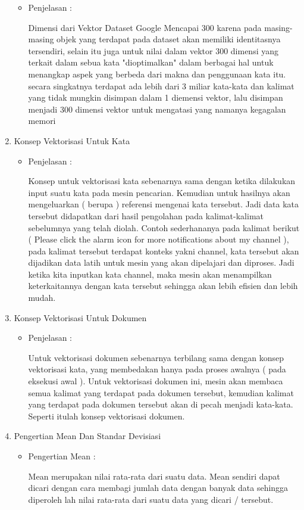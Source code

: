 \begin{enumerate}
\begin{itemize}
\item  Penjelasan :
\par Dimensi dari Vektor Dataset Google Mencapai 300 karena  pada masing-masing objek yang terdapat pada dataset akan memiliki identitasnya tersendiri, selain itu juga untuk nilai dalam vektor 300 dimensi yang terkait dalam sebua kata "dioptimalkan" dalam  berbagai hal untuk menangkap aspek yang berbeda dari makna dan penggunaan kata itu. secara singkatnya terdapat ada lebih dari 3 miliar kata-kata dan kalimat yang tidak mungkin disimpan dalam 1 diemensi vektor, lalu disimpan menjadi 300 dimensi vektor untuk mengatasi yang namanya kegagalan memori
\end{itemize}
\item Konsep Vektorisasi Untuk Kata
\begin{itemize}
\item  Penjelasan :
\par Konsep untuk vektorisasi kata sebenarnya sama dengan ketika dilakukan input suatu kata pada mesin pencarian. Kemudian untuk hasilnya akan mengeluarkan ( berupa ) referensi mengenai kata tersebut. Jadi data kata tersebut didapatkan dari hasil pengolahan pada kalimat-kalimat sebelumnya yang telah diolah. Contoh sederhananya pada kalimat berikut ( Please click the alarm icon for more notifications about my channel ), pada kalimat tersebut terdapat konteks yakni channel, kata tersebut akan dijadikan data latih untuk mesin yang akan dipelajari dan diproses. Jadi ketika kita inputkan kata channel, maka mesin akan menampilkan keterkaitannya dengan kata tersebut sehingga akan lebih efisien dan lebih mudah.
\end{itemize}
\item Konsep Vektorisasi Untuk Dokumen
\begin{itemize}
\item  Penjelasan :
\par Untuk vektorisasi dokumen sebenarnya terbilang sama dengan konsep vektorisasi kata, yang membedakan hanya pada proses awalnya ( pada eksekusi awal ). Untuk vektorisasi dokumen ini, mesin akan membaca semua kalimat yang terdapat pada dokumen tersebut, kemudian kalimat yang terdapat pada dokumen tersebut akan di pecah menjadi kata-kata. Seperti itulah konsep vektorisasi dokumen.
\end{itemize}
\item Pengertian Mean Dan Standar Devisiasi
\begin{itemize}
\item  Pengertian Mean :
\par Mean merupakan nilai rata-rata dari suatu data. Mean sendiri dapat dicari dengan cara membagi jumlah data dengan banyak data sehingga diperoleh lah nilai rata-rata dari suatu data yang dicari / tersebut. 


\end{itemize}
\end{enumerate}

